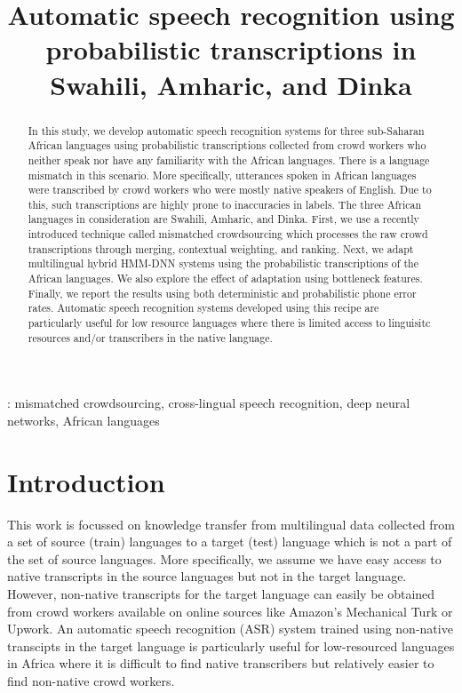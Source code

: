 \documentclass[a4paper]{article}
\title{Automatic speech recognition using probabilistic transcriptions in Swahili, Amharic, and Dinka}
\begin{document}
\maketitle

\begin{abstract}
In this study, we develop automatic speech recognition systems for three sub-Saharan African languages
using probabilistic transcriptions collected from crowd workers who neither speak nor have any familiarity 
with the African languages. There is a language mismatch in this scenario. More specifically, utterances spoken in African languages were transcribed by crowd workers who were mostly native speakers of English. Due to this, such transcriptions are highly prone to inaccuracies in labels. The three African languages in consideration are Swahili, Amharic, and Dinka. First, we use a recently introduced technique called mismatched crowdsourcing which processes the raw crowd transcriptions through merging, contextual weighting, and ranking. Next, we  adapt multilingual hybrid HMM-DNN systems using the probabilistic transcriptions of the African languages. We also explore the effect of adaptation using bottleneck features. Finally, we report the results using both deterministic and probabilistic phone error rates. Automatic speech recognition systems developed using this recipe are particularly useful for low resource languages where there is limited access to linguisitc resources and/or transcribers in the native language.
\end{abstract}
%
: mismatched crowdsourcing, cross-lingual speech recognition, deep neural networks,
African languages
\vspace{-3mm}
%
\section{Introduction}  \vspace{-2mm}
\label{sec:Introduction}
This work is focussed on knowledge transfer from multilingual data collected from a set of source (train) languages to a target (test) language which is not a part of the set of source languages. More specifically, we assume we have easy access to native transcripts in the source languages but not in the target language. However, non-native transcripts for the target language can easily be obtained from crowd workers available on online sources like Amazon's Mechanical Turk or Upwork. An automatic speech recognition (ASR) system trained using non-native transcipts in the target language is particularly useful for low-resourced languages in Africa where it is difficult to find native transcribers but relatively easier to find non-native crowd workers. 
\end{document}
